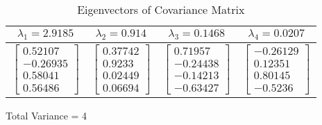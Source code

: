 \documentclass{article}
\begin{document}
\pagestyle{empty}

\begin{table}[!h]
\centering
\caption{\label{tab:unnamed-chunk-7}Eigenvectors of Covariance Matrix}
\centering
\begin{threeparttable}
\begin{tabular}[t]{cccc}
\toprule
$\lambda_1 = 2.9185$ & $\lambda_2 = 0.914$ & $\lambda_3 = 0.1468$ & $\lambda_4 = 0.0207$\\
\midrule
$\begin{bmatrix}0.52107\\-0.26935\\0.58041\\0.56486\end{bmatrix}$ & $\begin{bmatrix}0.37742\\0.9233\\0.02449\\0.06694\end{bmatrix}$ & $\begin{bmatrix}0.71957\\-0.24438\\-0.14213\\-0.63427\end{bmatrix}$ & $\begin{bmatrix}-0.26129\\0.12351\\0.80145\\-0.5236\end{bmatrix}$\\
\bottomrule
\end{tabular}
\begin{tablenotes}[para]
\item Total Variance = 4
\end{tablenotes}
\end{threeparttable}
\end{table}
\end{document}
